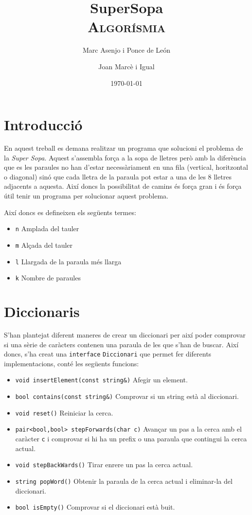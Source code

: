 \documentclass{article}
\title{
	\Huge
	\textbf{SuperSopa} \\ 
	\scshape Algorísmia
}
\author{
	Marc Asenjo i Ponce de León \and 
	Joan Marcè i Igual
}
\date{\today}
\begin{document}
\maketitle


\section{Introducció}
En aquest treball es demana realitzar un programa que solucioni el problema de la \emph{Super Sopa}. Aquest s'assembla força a la sopa de lletres però amb la diferència que es les paraules no han d'estar necessàriament en una fila (vertical, horitzontal o diagonal) sinó que cada lletra de la paraula pot estar a una de les 8 lletres adjacents a aquesta. Així doncs la possibilitat de camins és força gran i és força útil tenir un programa per solucionar aquest problema.

Així doncs es defineixen els següents termes:

\begin{itemize}
	\item \verb|n| Amplada del tauler
	\item \verb|m| Alçada del tauler
	\item \verb|l| Llargada de la paraula més llarga
	\item \verb|k| Nombre de paraules
\end{itemize}

\section{Diccionaris}
S'han plantejat diferent maneres de crear un diccionari per així poder comprovar si una sèrie de caràcters contenen una paraula de les que s'han de buscar. Així doncs, s'ha creat una \verb|interface| \verb|Diccionari| que permet fer diferents implementacions, conté les següents funcions:

\begin{itemize}
	\item \verb|void insertElement(const string&)| Afegir un element.
	\item \verb|bool contains(const string&)| Comprovar si un string està al diccionari.
	\item \verb|void reset()| Reiniciar la cerca.
	\item \verb|pair<bool,bool> stepForwards(char c)| Avançar un pas a la cerca amb el caràcter \verb|c| i comprovar si hi ha un prefix o una paraula que contingui la cerca actual.
	\item \verb|void stepBackWards()| Tirar enrere un pas la cerca actual.
	\item \verb|string popWord()| Obtenir la paraula de la cerca actual i eliminar-la del diccionari.
	\item \verb|bool isEmpty()| Comprovar si el diccionari està buit.
\end{itemize}
	
\end{document}
